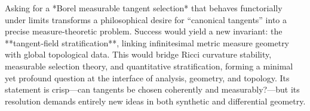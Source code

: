 Asking for a *Borel measurable tangent selection* that behaves functorially under limits transforms a philosophical desire for “canonical tangents” into a precise measure‑theoretic problem.  Success would yield a new invariant: the **tangent‑field stratification**, linking infinitesimal metric measure geometry with global topological data.  This would bridge Ricci curvature stability, measurable selection theory, and quantitative stratification, forming a minimal yet profound question at the interface of analysis, geometry, and topology.  Its statement is crisp—can tangents be chosen coherently and measurably?—but its resolution demands entirely new ideas in both synthetic and differential geometry.